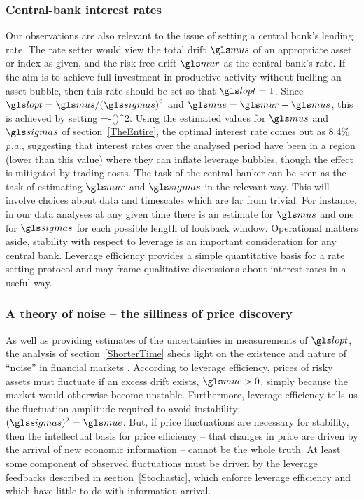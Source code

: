 \subsubsection{Central-bank interest rates}
Our observations are also relevant to the issue of setting a central bank's lending rate. The rate setter would view the total drift $\mus$ of an appropriate asset or index as given, and the risk-free drift $\mur$ as the central bank's rate. If the aim is to achieve full investment in productive activity without fuelling an asset bubble, then this rate should be set so that $\lopt=1$. Since $\lopt=\mus/(\sigmas)^2$ and $\mue=\mur-\mus$, this is achieved by setting 
\be
\mur=\mus-(\sigmas)^2.
\ee
Using the estimated values for $\mus$ and $\sigmas$ of section~\ref{TheEntire}, the optimal interest rate comes out as 8.4\% {\it p.a.}, suggesting that interest rates over the analysed period have been in a region (lower than this value) where they can inflate leverage bubbles, though the effect is mitigated by trading costs. The task of the central banker can be seen as the task of estimating $\mur$ and $\sigmas$ in the relevant way. This will involve choices about data and timescales which are far from trivial. For instance, in our data analyses at any given time there is an estimate for $\mus$ and one for $\sigmas$ for each possible length of lookback window. Operational matters aside, stability with respect to leverage is an important consideration for any central bank. Leverage efficiency provides a simple quantitative basis for a rate setting protocol and may frame qualitative discussions about interest rates in a useful way.


\subsubsection{A theory of noise -- the silliness of price discovery}
As well as providing estimates of the uncertainties in measurements of $\lopt$, the analysis of section~\ref{ShorterTime} sheds light on the existence and nature of ``noise'' in financial markets \cite{Black1986}. According to leverage efficiency, prices of risky assets must fluctuate if an excess drift exists, $\mue>0$, simply because the market would otherwise become unstable. Furthermore, leverage efficiency tells us the fluctuation amplitude required to avoid instability: $(\sigmas)^2=\mue$. But, if price fluctuations are necessary for stability, then the intellectual basis for price efficiency -- that changes in price are driven by the arrival of new economic information --  cannot be the whole truth. At least some component of observed fluctuations must be driven by the leverage feedbacks described in section~\ref{Stochastic}, which enforce leverage efficiency and which have little to do with information arrival.


